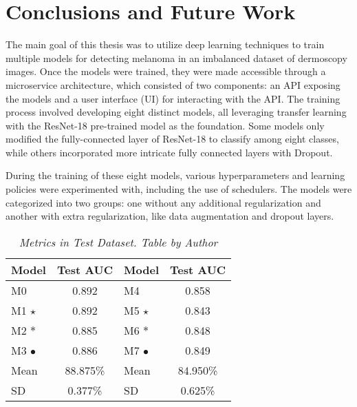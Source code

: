 \chapter{Conclusions and Future Work}
\label{cap:concl}

The main goal of this thesis was to utilize deep learning techniques to train
multiple models for detecting melanoma in an imbalanced dataset of dermoscopy
images. Once the models were trained, they were made accessible through a
microservice architecture, which consisted of two components: an API exposing
the models and a user interface (UI) for interacting with the API. The training
process involved developing eight distinct models, all leveraging transfer
learning with the ResNet-18 pre-trained model as the foundation. Some models
only modified the fully-connected layer of ResNet-18 to classify among eight
classes, while others incorporated more intricate fully connected layers with
Dropout. \newline

During the training of these eight models, various hyperparameters and learning
policies were experimented with, including the use of schedulers. The models
were categorized into two groups: one without any additional regularization and
another with extra regularization, like data augmentation and dropout layers.


\begin{table}[H]
\centering
\begin{tabular}{lc|lc}
    \toprule
  \textbf{Model} & \textbf{Test AUC} & \cellcolor{gray!50}\textbf{Model} & \cellcolor{gray!50}\textbf{Test AUC}  \\
\midrule
 M0 & 0.892 & \cellcolor{gray!50}M4 & \cellcolor{gray!50}0.858 \\
 M1 $\star$ & 0.892 & \cellcolor{gray!50}M5 $\star$ & \cellcolor{gray!50}0.843 \\
 M2 $\ast$ &  0.885 &  \cellcolor{gray!50}M6 $\ast$ & \cellcolor{gray!50}0.848 \\
 M3 $\bullet$ & 0.886 & \cellcolor{gray!50}M7 $\bullet$ & \cellcolor{gray!50}0.849 \\
 \midrule
Mean &  88.875\% & \cellcolor{gray!50}Mean & \cellcolor{gray!50}84.950\%  \\
SD &  0.377\%  &   \cellcolor{gray!50}SD &  \cellcolor{gray!50}0.625\%  \\

\bottomrule
\end{tabular}
\caption[Metrics in Test Dataset]
  {\textit{Metrics in Test Dataset. Table by Author}}
{\label{table:test-set-resume-metrics}}
\end{table}

